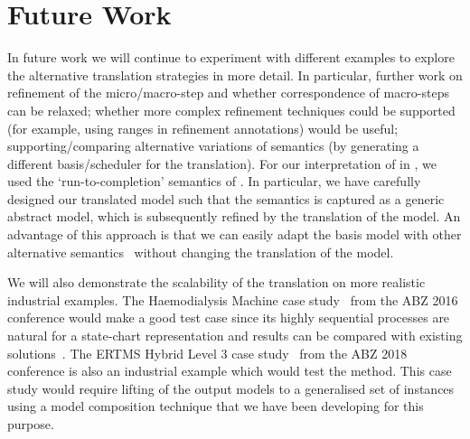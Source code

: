 \section{Future Work}
\label{sec:future}
In future work we will continue to experiment with different examples to explore the alternative translation strategies in more detail. 
In particular, further work on refinement of the micro/macro-step and whether correspondence of macro-steps can be relaxed; whether more complex refinement techniques could be supported (for example, using ranges in refinement annotations) would be useful; supporting/comparing alternative variations of semantics (by generating a different basis/scheduler for the translation).
For our interpretation of \statecharts in \iUMLB, we used the `run-to-completion' semantics of \statecharts.  In particular, we have carefully designed our translated model such that the semantics is captured as a generic abstract model, which is subsequently refined by the translation of the \SCXML model.  An advantage of this approach is that we can easily adapt the basis model with other alternative semantics~\mbox{\cite{Eshuis_2009}} without changing the translation of the \SCXML model. 

We will also demonstrate the scalability of the translation on more realistic industrial examples. 
The Haemodialysis Machine case study~\mbox{\cite{Mashkoor16}} from the ABZ 2016 conference would make a good test case since its highly sequential processes are natural for a state-chart representation and results can be compared with existing \mbox{\iUMLB} solutions~\mbox{\cite{HoSnLaBu16}}. 
The ERTMS Hybrid Level 3 case study~\mbox{\cite{HoBuRe18}} from the ABZ 2018 conference is also an industrial example which would test the method. 
This case study would require lifting of the output models to a generalised set of instances using a model composition technique that we have been developing for this purpose.

